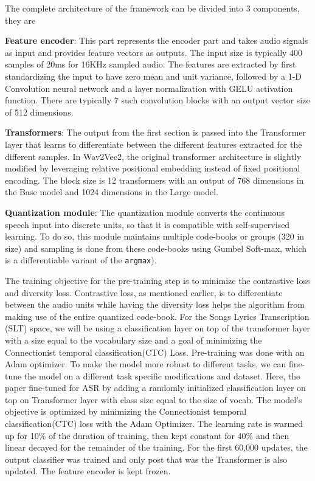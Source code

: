 The complete architecture of the framework can be divided into 3 components, they are

\textbf{Feature encoder}: This part represents the encoder part and takes audio signals as input and provides feature vectors as outputs. The input size is typically 400 samples of 20ms for 16KHz sampled audio. The features are extracted by first standardizing the input to have zero mean and unit variance, followed by a 1-D Convolution neural network and a layer normalization with GELU activation function. There are typically 7 such convolution blocks with an output vector size of 512 dimensions.

\textbf{Transformers}: The output from the first section is passed into the Transformer layer that learns to differentiate between the different features extracted for the different samples. In Wav2Vec2, the original transformer architecture is slightly modified by leveraging relative positional embedding instead of fixed positional encoding. The block size is 12 transformers with an output of 768 dimensions in the Base model and 1024 dimensions in the Large model.

\textbf{Quantization module}: The quantization module converts the continuous speech input into discrete units, so that it is compatible with self-supervised learning. To do so, this module maintains multiple code-books or groups (320 in size) and sampling is done from these code-books using Gumbel Soft-max, which is a differentiable variant of the \texttt{argmax}).

The training objective for the pre-training step is to minimize the contrastive loss and diversity loss. Contrastive loss, as mentioned earlier, is to differentiate between the audio units while having the diversity loss helps the algorithm from making use of the entire quantized code-book. For the Songs Lyrics Transcription (SLT) space, we will be using a classification layer on top of the transformer layer with a size equal to the vocabulary size and a goal of minimizing the Connectionist temporal classification(CTC) Loss. Pre-training was done with an Adam optimizer.
To make the model more robust to different tasks, we can fine-tune the model on a different task specific modifications and dataset. Here, the paper fine-tuned for ASR by adding a randomly initialized classification layer on top on Transformer layer with class size equal to the size of vocab. The model's objective is optimized by minimizing the Connectionist temporal classification(CTC) loss with the Adam Optimizer. The learning rate is warmed up for 10\% of the duration of training, then kept constant for 40\% and then linear decayed for the remainder of the training. For the first 60,000 updates, the output classifier was trained and only post that was the Transformer is also updated. The feature encoder is kept frozen.

